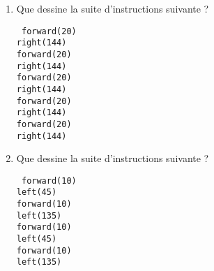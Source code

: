 \begin{td}\label{td:dessins}\em {}
\begin{minipage}[t]{7cm}
	\begin{enumerate}
	\item Que dessine la suite d'instructions suivante ?

		{\footnotesize\tt
		forward(20)\\
		right(144)\\
		forward(20)\\
		right(144)\\
		forward(20)\\
		right(144)\\
		forward(20)\\
		right(144)\\
		forward(20)\\
		right(144)
		}
	\end{enumerate}
\end{minipage}
\hfill
\begin{minipage}[t]{7cm}
	\begin{enumerate}\setcounter{enumi}{1}
	\item Que dessine la suite d'instructions suivante ?

		{\footnotesize\tt 
		forward(10)\\
		left(45)\\
		forward(10)\\
		left(135)\\
		forward(10)\\
		left(45)\\
		forward(10)\\
		left(135)
		}
	\end{enumerate}
\end{minipage}
\end{td}

